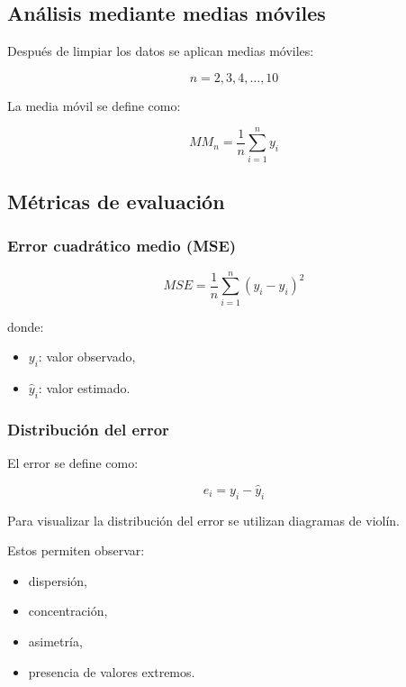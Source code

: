 \subsection{Análisis mediante medias móviles}

Después de limpiar los datos se aplican medias móviles:

\[
n=2,3,4,\dots,10
\]

La media móvil se define como:

\[
MM_n =
\frac{1}{n}
\sum_{i=1}^{n} y_i
\]

\subsection{Métricas de evaluación}

\subsubsection{Error cuadrático medio (MSE)}

\[
MSE =
\frac{1}{n}
\sum_{i=1}^{n}
(y_i-\hat y_i)^2
\]

donde:

\begin{itemize}
\item \(y_i\): valor observado,
\item \(\hat y_i\): valor estimado.
\end{itemize}

\subsubsection{Distribución del error}

El error se define como:

\[
e_i = y_i - \hat y_i
\]

Para visualizar la distribución del error se utilizan diagramas de violín.

Estos permiten observar:

\begin{itemize}
\item dispersión,
\item concentración,
\item asimetría,
\item presencia de valores extremos.
\end{itemize}

